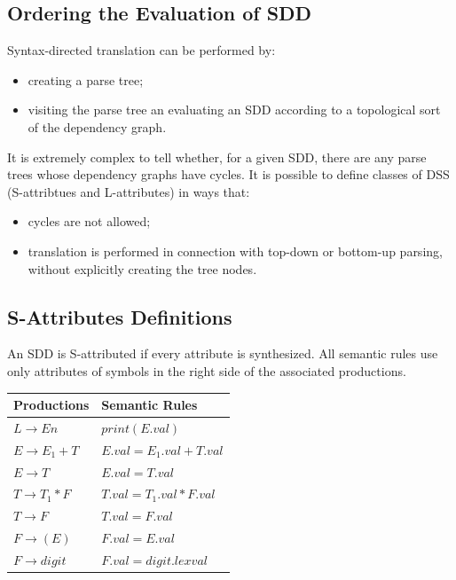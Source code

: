 \subsection{Ordering the Evaluation of SDD}
Syntax-directed translation can be performed by:
\begin{itemize}
	\item creating a parse tree;
	\item visiting the parse tree an evaluating an SDD according to a topological sort of the dependency graph.
\end{itemize}
It is extremely complex to tell whether, for a given SDD, there are any parse trees whose dependency graphs have cycles.
It is possible to define classes of DSS (S-attribtues and L-attributes) in ways that:
\begin{itemize}
	\item cycles are not allowed;
	\item translation is performed in connection with top-down or bottom-up parsing, without explicitly creating the tree nodes.
\end{itemize}

\subsection{S-Attributes Definitions}
An SDD is S-attributed if every attribute is synthesized.
All semantic rules use only attributes of symbols in the right side of the associated productions.

\begin{table}[h]
	\centering
	\begin{tabular}{l|l}
		Productions & Semantic Rules \\ \hline
		$L \to En$ & $print(E.val)$ \\ \hline
		$E \to E_1 + T$ & $E.val = E_1.val + T.val$ \\ \hline
		$E \to T$ & $E.val = T.val$ \\ \hline
		$T \to T_1 \ast F$ & $T.val = T_1.val \ast F.val$ \\ \hline
		$T \to F$ & $T.val = F.val$ \\ \hline
		$F \to (E)$ & $F.val = E.val$ \\ \hline
		$F \to digit$ & $F.val = digit.lexval$ 
	\end{tabular}
\end{table}

